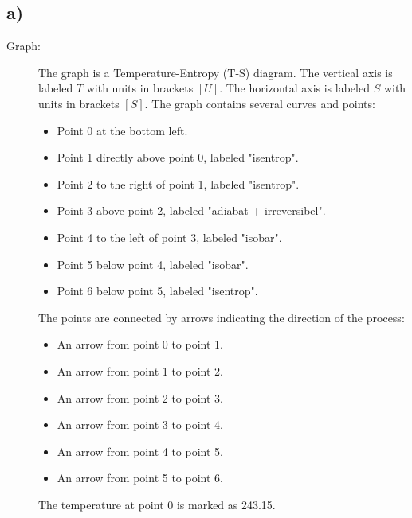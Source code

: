 

\subsection*{a)}

\begin{description}
    \item[Graph:] The graph is a Temperature-Entropy (T-S) diagram. The vertical axis is labeled \( T \) with units in brackets \([U]\). The horizontal axis is labeled \( S \) with units in brackets \([S]\). The graph contains several curves and points:
    \begin{itemize}
        \item Point 0 at the bottom left.
        \item Point 1 directly above point 0, labeled "isentrop".
        \item Point 2 to the right of point 1, labeled "isentrop".
        \item Point 3 above point 2, labeled "adiabat + irreversibel".
        \item Point 4 to the left of point 3, labeled "isobar".
        \item Point 5 below point 4, labeled "isobar".
        \item Point 6 below point 5, labeled "isentrop".
    \end{itemize}
    The points are connected by arrows indicating the direction of the process:
    \begin{itemize}
        \item An arrow from point 0 to point 1.
        \item An arrow from point 1 to point 2.
        \item An arrow from point 2 to point 3.
        \item An arrow from point 3 to point 4.
        \item An arrow from point 4 to point 5.
        \item An arrow from point 5 to point 6.
    \end{itemize}
    The temperature at point 0 is marked as 243.15.
\end{description}